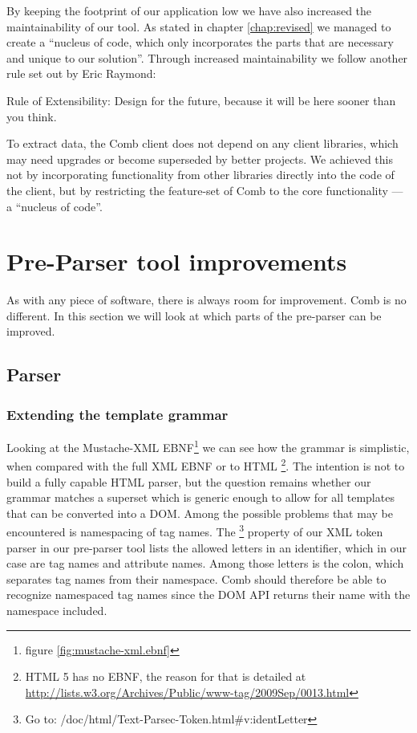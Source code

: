 \documentclass[thesis.tex]{subfiles}
\begin{document}
By keeping the footprint of our application low we have also increased the
maintainability of our tool. As stated in chapter \ref{chap:revised} we managed
to create a ``nucleus of code, which only incorporates the parts that are
necessary and unique to our solution''. Through increased maintainability we
follow another rule set out by Eric Raymond:
\begin{citequote}{\cite[Chapter 1]{UXART}}
Rule of Extensibility: Design for the future, because it will be here sooner than you think.
\end{citequote}
To extract data, the Comb client does not depend on any client libraries, which
may need upgrades or become superseded by better projects.
We achieved this not by incorporating functionality from other libraries
directly into the code of the client, but by restricting the feature-set of Comb
to the core functionality --- a ``nucleus of code''.




\section{Pre-Parser tool improvements}
As with any piece of software, there is always room for improvement.
Comb is no different. In this section we will look at which parts of the
pre-parser can be improved.

\subsection{Parser}

\subsubsection{Extending the template grammar}
Looking at the Mustache-XML EBNF\footnote{figure \ref{fig:mustache-xml.ebnf}} we
can see how the grammar is simplistic, when compared with the
full XML EBNF \cite[section 2/\#sec-documents]{XMLSPEC} or to
HTML \cite{HTMLSPEC}\footnote{
	HTML 5 has no EBNF, the reason for that is detailed at
	\url{http://lists.w3.org/Archives/Public/www-tag/2009Sep/0013.html}
}. The intention is not to build a fully capable HTML parser, but the question
remains whether our grammar matches a superset which is generic enough to allow
for all templates that can be converted into a DOM. Among the possible problems
that may be encountered is namespacing of tag names. The 
\cite{PARSECDOC}\footnote{
	Go to: /doc/html/Text-Parsec-Token.html\#v:identLetter
} property of our XML token parser in our
pre-parser tool lists the allowed letters in an identifier,
which in our case are tag names and attribute names. Among those letters is
the colon, which separates tag names from their namespace.
Comb should therefore be able to recognize namespaced tag names since the
DOM API returns their name with the namespace included.
\end{document}
